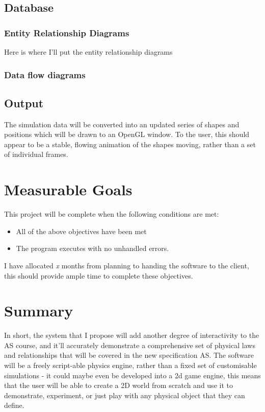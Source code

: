\subsection{Database}

\subsubsection{Entity Relationship Diagrams}
	Here is where I'll put the entity relationship diagrams

\subsubsection{Data flow diagrams}


\subsection{Output}
	The simulation data will be  converted into an updated series of shapes and positions which will be drawn to an OpenGL window. To the user, this should appear to be a stable, flowing animation of the shapes moving, rather than a set of individual frames.
	
\section{Measurable Goals}
	This project will be complete when the following conditions are met:
	\begin{itemize}
		\item All of the above objectives have been met
		\item The program executes with no unhandled errors.
	\end{itemize}
	I have allocated \textit{x} months from planning to handing the software to the client, this should provide ample time to complete these objectives.
	




\section{Summary}
In short, the system that I propose will add another degree of interactivity to the AS course, and it'll accurately demonstrate a comprehensive set of physical laws and relationships that will be covered in the new specification AS. The software will be a freely script-able physics engine, rather than a fixed set of customisable simulations - it could maybe even be developed into a 2d game engine, this means that the user will be able to create a 2D world from scratch and use it to demonstrate, experiment, or just play with any physical object that they can define.